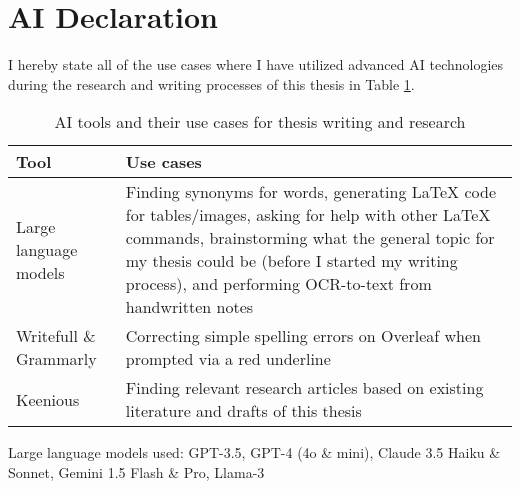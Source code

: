 


\chapter*{AI Declaration\label{extra:declaration}}
\begin{comment}
\end{comment}


I hereby state all of the use cases where I have utilized advanced AI technologies during the research and writing processes of this thesis in Table \ref{table:declaration}.


\begin{table}[ht!] 
\centering 
\renewcommand{\arraystretch}{1.5} %
\setlength{\tabcolsep}{5pt} %
\begin{tabularx}{\textwidth}{|l|X|} %
\hline  
\textbf{Tool} & \textbf{Use cases} \\ \hline  
Large language models & Finding synonyms for words, generating LaTeX code for tables/images, asking for help with other LaTeX commands, brainstorming what the general topic for my thesis could be (before I started my writing process), and performing OCR-to-text from handwritten notes\\ \hline  
Writefull \& Grammarly & Correcting simple spelling errors on Overleaf when prompted via a red underline\\ \hline  
Keenious & Finding relevant research articles based on existing literature and drafts of this thesis\\ \hline  
\end{tabularx}  
\caption{AI tools and their use cases for thesis writing and research}  
\label{table:declaration}  
\end{table}  

Large language models used: GPT-3.5, GPT-4 (4o \& mini), Claude 3.5 Haiku \& Sonnet, Gemini 1.5 Flash \& Pro, Llama-3
